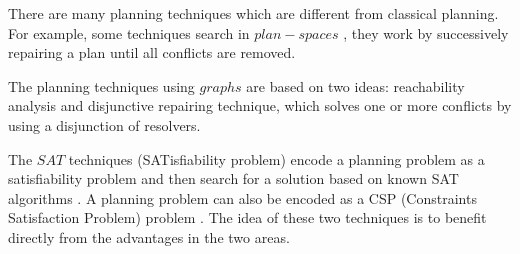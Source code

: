 
There are many planning techniques which are different from classical planning. For example, some techniques search in $plan-spaces$ \cite{PW92}, they work by successively repairing a plan until all conflicts are removed.


The planning techniques using $graphs$ \cite{BF97} are based on two ideas: reachability analysis and disjunctive repairing technique, which solves one or more conflicts by using a disjunction of resolvers. 


The $SAT$ techniques (SATisfiability problem) encode a planning problem as a satisfiability problem and then search for a solution based on known SAT algorithms \cite{RG08}\cite{KS98a}. A planning problem can also be encoded as a CSP (Constraints Satisfaction Problem) problem \cite{Kam00}\cite{PV08}. The idea of these two techniques is to benefit directly from the advantages in the two areas.



